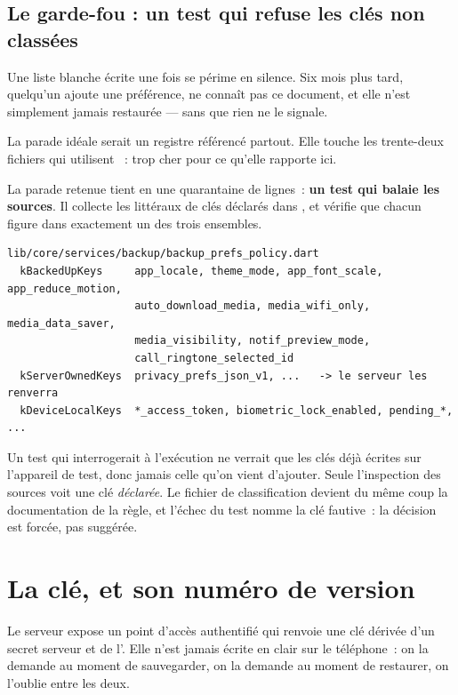 \documentclass[11pt,a4paper,oneside]{report}
\begin{document}
\subsection{Le garde-fou : un test qui refuse les clés non classées}

Une liste blanche écrite une fois se périme en silence. Six mois plus tard, quelqu'un ajoute
une préférence, ne connaît pas ce document, et elle n'est simplement jamais restaurée --- sans
que rien ne le signale.

La parade idéale serait un registre  référencé partout. Elle touche les
trente-deux fichiers qui utilisent ~: trop cher pour ce qu'elle
rapporte ici.

La parade retenue tient en une quarantaine de lignes~: \textbf{un test qui balaie les
sources}. Il collecte les littéraux de clés déclarés dans , et vérifie que chacun
figure dans exactement un des trois ensembles.

\begin{lstlisting}[style=Alanya, language={}]
lib/core/services/backup/backup_prefs_policy.dart
  kBackedUpKeys     app_locale, theme_mode, app_font_scale, app_reduce_motion,
                    auto_download_media, media_wifi_only, media_data_saver,
                    media_visibility, notif_preview_mode,
                    call_ringtone_selected_id
  kServerOwnedKeys  privacy_prefs_json_v1, ...   -> le serveur les renverra
  kDeviceLocalKeys  *_access_token, biometric_lock_enabled, pending_*, ...
\end{lstlisting}

\begin{note}
Un test qui interrogerait  à l'exécution ne verrait que les clés
déjà écrites sur l'appareil de test, donc jamais celle qu'on vient d'ajouter. Seule
l'inspection des sources voit une clé \emph{déclarée}. Le fichier de classification devient
du même coup la documentation de la règle, et l'échec du test nomme la clé fautive~: la
décision est forcée, pas suggérée.
\end{note}

\section{La clé, et son numéro de version}
\label{sec:cle}

Le serveur expose un point d'accès authentifié qui renvoie une clé dérivée d'un secret
serveur et de l'. Elle n'est jamais écrite en clair sur le téléphone~: on la
demande au moment de sauvegarder, on la demande au moment de restaurer, on l'oublie entre
les deux.
\end{document}

